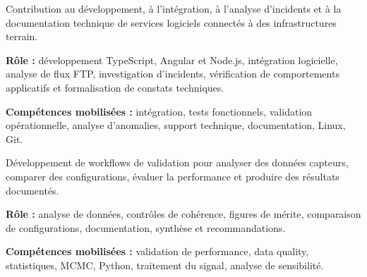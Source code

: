 \documentclass[8pt,a4paper,ragged2e,withhyper]{altacv}
\begin{document}
Contribution au développement, à l’intégration, à l’analyse d’incidents et à la documentation technique de services logiciels connectés à des infrastructures terrain.

\textbf{Rôle :} développement TypeScript, Angular et Node.js, intégration logicielle, analyse de flux FTP, investigation d’incidents, vérification de comportements applicatifs et formalisation de constats techniques.

\textbf{Compétences mobilisées :} intégration, tests fonctionnels, validation opérationnelle, analyse d’anomalies, support technique, documentation, Linux, Git.

\divider


Développement de workflows de validation pour analyser des données capteurs, comparer des configurations, évaluer la performance et produire des résultats documentés.

\textbf{Rôle :} analyse de données, contrôles de cohérence, figures de mérite, comparaison de configurations, documentation, synthèse et recommandations.

\textbf{Compétences mobilisées :} validation de performance, data quality, statistiques, MCMC, Python, traitement du signal, analyse de sensibilité.


\vspace{-.3cm}


{\small
{}
}

\divider\smallskip
\vspace{-.3cm}


{\small
{}
}
\end{document}
